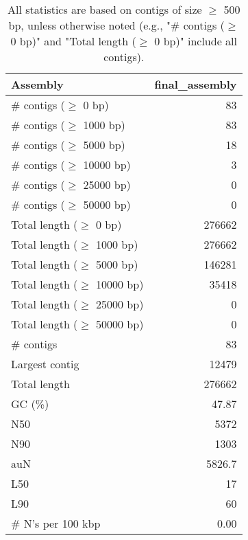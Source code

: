 \documentclass[12pt,a4paper]{article}
\begin{document}
\begin{table}[ht]
\begin{center}
\caption{All statistics are based on contigs of size $\geq$ 500 bp, unless otherwise noted (e.g., "\# contigs ($\geq$ 0 bp)" and "Total length ($\geq$ 0 bp)" include all contigs).}
\begin{tabular}{|l*{1}{|r}|}
\hline
Assembly & final\_assembly \\ \hline
\# contigs ($\geq$ 0 bp) & 83 \\ \hline
\# contigs ($\geq$ 1000 bp) & 83 \\ \hline
\# contigs ($\geq$ 5000 bp) & 18 \\ \hline
\# contigs ($\geq$ 10000 bp) & 3 \\ \hline
\# contigs ($\geq$ 25000 bp) & 0 \\ \hline
\# contigs ($\geq$ 50000 bp) & 0 \\ \hline
Total length ($\geq$ 0 bp) & 276662 \\ \hline
Total length ($\geq$ 1000 bp) & 276662 \\ \hline
Total length ($\geq$ 5000 bp) & 146281 \\ \hline
Total length ($\geq$ 10000 bp) & 35418 \\ \hline
Total length ($\geq$ 25000 bp) & 0 \\ \hline
Total length ($\geq$ 50000 bp) & 0 \\ \hline
\# contigs & 83 \\ \hline
Largest contig & 12479 \\ \hline
Total length & 276662 \\ \hline
GC (\%) & 47.87 \\ \hline
N50 & 5372 \\ \hline
N90 & 1303 \\ \hline
auN & 5826.7 \\ \hline
L50 & 17 \\ \hline
L90 & 60 \\ \hline
\# N's per 100 kbp & 0.00 \\ \hline
\end{tabular}
\end{center}
\end{table}
\end{document}
